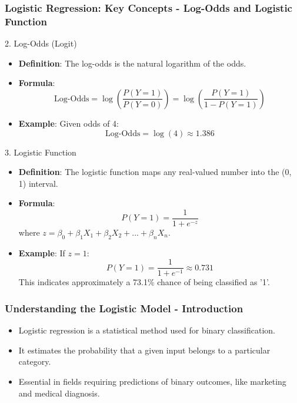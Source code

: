 \documentclass[aspectratio=169]{beamer}
\begin{document}
\begin{frame}[fragile]
    \frametitle{Logistic Regression: Key Concepts - Log-Odds and Logistic Function}
    \begin{block}{2. Log-Odds (Logit)}
        \begin{itemize}
            \item \textbf{Definition}: The log-odds is the natural logarithm of the odds.
            \item \textbf{Formula}:
            \begin{equation}
                \text{Log-Odds} = \log\left(\frac{P(Y=1)}{P(Y=0)}\right) = \log\left(\frac{P(Y=1)}{1 - P(Y=1)}\right)
            \end{equation}
            \item \textbf{Example}: Given odds of 4:
            \begin{equation}
                \text{Log-Odds} = \log(4) \approx 1.386
            \end{equation}
        \end{itemize}
    \end{block}

    \begin{block}{3. Logistic Function}
        \begin{itemize}
            \item \textbf{Definition}: The logistic function maps any real-valued number into the (0, 1) interval.
            \item \textbf{Formula}:
            \begin{equation}
                P(Y=1) = \frac{1}{1 + e^{-z}}
            \end{equation}
            where $z = \beta_0 + \beta_1X_1 + \beta_2X_2 + ... + \beta_nX_n$.
            \item \textbf{Example}: If $z=1$:
            \begin{equation}
                P(Y=1) = \frac{1}{1 + e^{-1}} \approx 0.731
            \end{equation}
            This indicates approximately a 73.1\% chance of being classified as '1'.
        \end{itemize}
    \end{block}
\end{frame}

\begin{frame}[fragile]
    \frametitle{Understanding the Logistic Model - Introduction}
    \begin{itemize}
        \item Logistic regression is a statistical method used for binary classification.
        \item It estimates the probability that a given input belongs to a particular category.
        \item Essential in fields requiring predictions of binary outcomes, like marketing and medical diagnosis.
    \end{itemize}
\end{frame}
\end{document}
